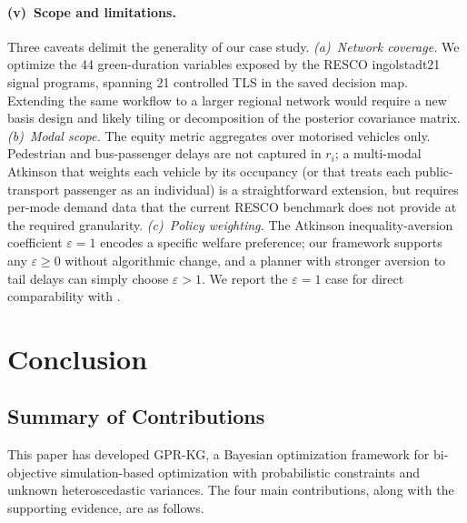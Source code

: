 \documentclass[12pt]{article}
\theoremstyle{plain}
\theoremstyle{definition}
\theoremstyle{remark}
\begin{document}
\paragraph{(v)~Scope and limitations.}
Three caveats delimit the generality of our case study.
\emph{(a)~Network coverage.}  We optimize the 44 green-duration
variables exposed by the RESCO ingolstadt21 signal programs, spanning
21 controlled TLS in the saved decision map.  Extending the same
workflow to a larger regional network would require a new basis design
and likely tiling or decomposition of the posterior covariance matrix.
\emph{(b)~Modal scope.}  The equity metric aggregates over motorised
vehicles only.  Pedestrian and bus-passenger delays are not captured
in $r_{i}$; a multi-modal Atkinson that weights each vehicle by its
occupancy (or that treats each public-transport passenger as an
individual) is a straightforward extension, but requires per-mode
demand data that the current RESCO benchmark does not provide at the
required granularity.
\emph{(c)~Policy weighting.}  The Atkinson inequality-aversion
coefficient $\varepsilon=1$ encodes a specific welfare preference; our
framework supports any $\varepsilon\ge 0$ without algorithmic change,
and a planner with stronger aversion to tail delays can simply choose
$\varepsilon>1$.  We report the $\varepsilon=1$ case for direct
comparability with \citep{ZhengXueXuRan2019a}.


\section{Conclusion}\label{sec:conclusion}

\subsection{Summary of Contributions}\label{subsec:summary}

This paper has developed GPR-KG, a Bayesian optimization framework for
bi-objective simulation-based optimization with probabilistic constraints
and unknown heteroscedastic variances.  The four main contributions, along
with the supporting evidence, are as follows.
\end{document}
